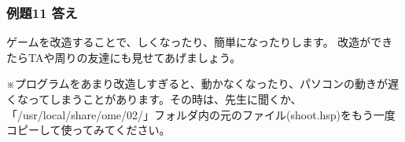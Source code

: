 \subsubsection*{例題11 答え}

ゲームを改造することで、しくなったり、簡単になったりします。
改造ができたらTAや周りの友達にも見せてあげましょう。

※プログラムをあまり改造しすぎると、動かなくなったり、パソコンの動きが遅くなってしまうことがあります。その時は、先生に聞くか、「/usr/local/share/ome/02/」フォルダ内の元のファイル(shoot.hsp)をもう一度コピーして使ってみてください。

